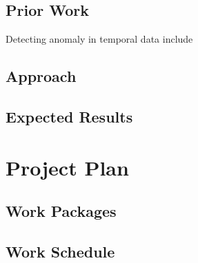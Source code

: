 \documentclass[12pt]{article}
\begin{document}
    \subsection{Prior Work}
    Detecting anomaly in temporal data include

    \subsection{Approach}


    \subsection{Expected Results}


\section{Project Plan}

    \subsection{Work Packages}

    \subsection{Work Schedule}




\end{document}
